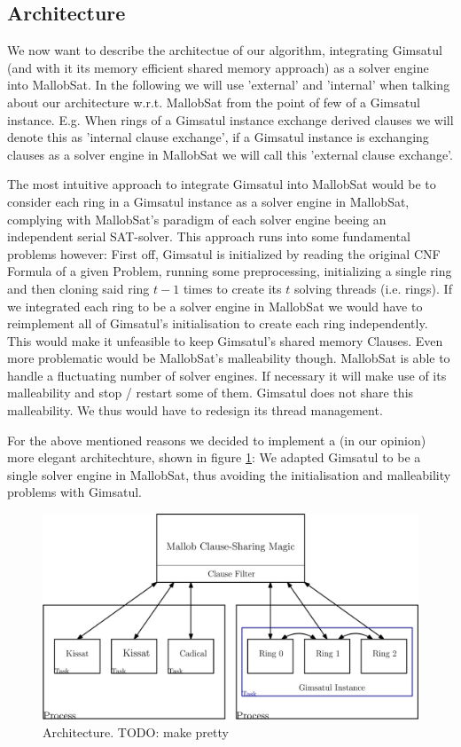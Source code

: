 \documentclass[12pt,a4paper,twoside]{scrartcl}
\numberwithin{equation}{section}
\begin{document}
\subsection{Architecture}

We now want to describe the architectue of our algorithm, integrating Gimsatul (and with it its memory efficient shared memory approach) as a solver engine into MallobSat. In the following we will use 'external' and 'internal' when talking about our architecture w.r.t. MallobSat from the point of few of a Gimsatul instance. E.g. When rings of a Gimsatul instance exchange derived clauses we will denote this as 'internal clause exchange', if a Gimsatul instance is exchanging clauses as a solver engine in MallobSat we will call this 'external clause exchange'.

The most intuitive approach to integrate Gimsatul into MallobSat would be to consider each ring in a Gimsatul instance as a solver engine in MallobSat, complying with MallobSat's paradigm of each solver engine beeing an independent serial SAT-solver. This approach runs into some fundamental problems however: 
First off, Gimsatul is initialized by reading the original CNF Formula of a given Problem, running some preprocessing, initializing a single ring and then cloning said ring $t - 1$ times to create its $t$ solving threads (i.e. rings). If we integrated each ring to be a solver engine in MallobSat we would have to reimplement all of Gimsatul's initialisation to create each ring independently. This would make it unfeasible to keep Gimsatul's shared memory Clauses.
Even more problematic would be MallobSat's malleability though. MallobSat is able to handle a fluctuating number of solver engines. If necessary it will make use of its malleability and stop / restart some of them. Gimsatul does not share this malleability. We thus would have to redesign its thread management.

For the above mentioned reasons we decided to implement a (in our opinion) more elegant architechture, shown in figure \ref{fig:architecture}: We adapted Gimsatul to be a single solver engine in MallobSat, thus avoiding the initialisation and malleability problems with Gimsatul.

\begin{figure}
  \center
  \includegraphics[scale=.2]{figures/architektur.png}
  \caption{Architecture. TODO: make pretty}
  \label{fig:architecture}
\end{figure}
\end{document}
